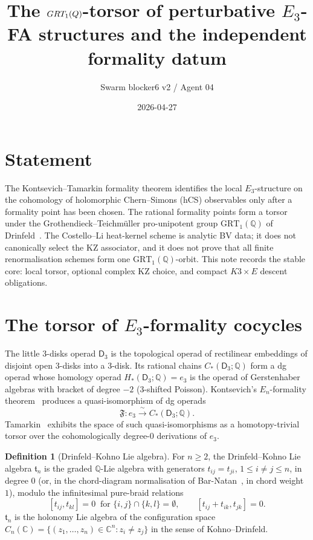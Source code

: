 \documentclass[11pt]{amsart}
\title{The $\mathrm{GRT}_1(\Q)$-torsor of perturbative $E_3$-FA structures and the independent formality datum}
\author{Swarm blocker6 v2 / Agent 04}
\date{2026-04-27}
\theoremstyle{plain}
\theoremstyle{definition}
\newtheorem{definition}[theorem]{Definition}
\theoremstyle{remark}
\providecommand{\C}{\mathbb{C}}
\providecommand{\Q}{\mathbb{Q}}
\providecommand{\GRT}{\mathrm{GRT}}
\providecommand{\frakt}{\mathfrak{t}}
\begin{document}
\maketitle

\section*{Statement}
\label{sec:statement}

The Kontsevich--Tamarkin formality theorem identifies the local
$E_3$-structure on the cohomology of holomorphic Chern--Simons
\textup{(}hCS\textup{)} observables only after a formality point has
been chosen. The rational formality points form a torsor under the
Grothendieck--Teichm\"uller pro-unipotent group $\GRT_1(\Q)$ of
Drinfeld~\cite{Drinfeld1990}. The Costello--Li heat-kernel scheme is
analytic BV data; it does not canonically select the KZ associator, and
it does not prove that all finite renormalisation schemes form one
$\GRT_1(\Q)$-orbit. This note records the stable core: local torsor,
optional complex KZ choice, and compact $K3\times E$ descent
obligations.

\section{The torsor of $E_3$-formality cocycles}
\label{sec:torsor}

The little $3$-disks operad $\mathsf{D}_3$ is the topological operad of rectilinear embeddings of disjoint open $3$-disks into a $3$-disk. Its rational chains $C_*(\mathsf{D}_3; \Q)$ form a dg operad whose homology operad $H_*(\mathsf{D}_3; \Q) = e_3$ is the operad of Gerstenhaber algebras with bracket of degree $-2$ \textup{(}$3$-shifted Poisson\textup{)}. Kontsevich's $E_n$-formality theorem~\cite{Kontsevich1999, Kontsevich1999LMP} produces a quasi-isomorphism of dg operads
\[
  \mathfrak{F}: e_3 \xrightarrow{\;\sim\;} C_*(\mathsf{D}_3; \Q).
\]
Tamarkin~\cite{Tamarkin1998, Tamarkin2003} exhibits the space of such quasi-isomorphisms as a homotopy-trivial torsor over the cohomologically degree-$0$ derivations of $e_3$.

\begin{definition}[Drinfeld--Kohno Lie algebra]
\label{def:drinfeld-kohno}
For $n \geq 2$, the Drinfeld--Kohno Lie algebra $\frakt_n$ is the graded $\Q$-Lie algebra with generators $t_{ij} = t_{ji}$, $1 \leq i \neq j \leq n$, in degree $0$ \textup{(}or, in the chord-diagram normalisation of Bar-Natan~\cite{BarNatan1995}, in chord weight $1$\textup{)}, modulo the infinitesimal pure-braid relations
\[
  [t_{ij}, t_{kl}] = 0 \;\;\text{for $\{i,j\}\cap\{k,l\}=\emptyset$},\qquad
  [t_{ij} + t_{ik}, t_{jk}] = 0 .
\]
$\frakt_n$ is the holonomy Lie algebra of the configuration space $C_n(\C) = \{(z_1, \ldots, z_n) \in \C^n : z_i \neq z_j\}$ in the sense of Kohno--Drinfeld.
\end{definition}
\end{document}

